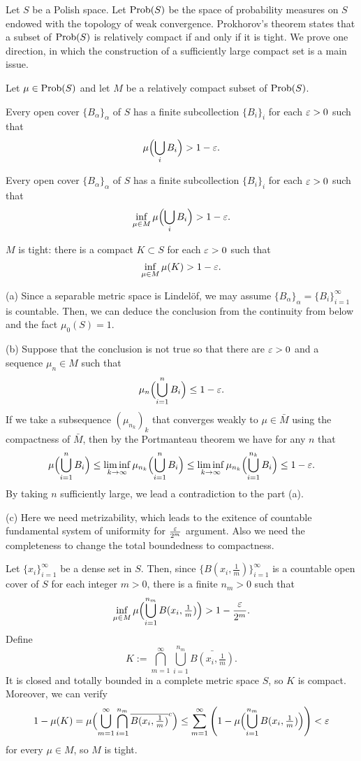 \documentclass{../note}
\begin{document}
\begin{prb}
Let $S$ be a Polish space.
Let $\operatorname{Prob}(S)$ be the space of probability measures on $S$ endowed with the topology of weak convergence.
Prokhorov's theorem states that a subset of $\operatorname{Prob}(S)$ is relatively compact if and only if it is tight.
We prove one direction, in which the construction of a sufficiently large compact set is a main issue.

Let $\mu\in\operatorname{Prob}(S)$ and let $M$ be a relatively compact subset of $\operatorname{Prob}(S)$.
\begin{parts}
\item Every open cover $\{B_\alpha\}_\alpha$ of $S$ has a finite subcollection $\{B_i\}_i$ for each $\varepsilon>0$ such that
\[\mu\Bigl(\bigcup_iB_i\Bigr)>1-\varepsilon.\]
\item Every open cover $\{B_\alpha\}_\alpha$ of $S$ has a finite subcollection $\{B_i\}_i$ for each $\varepsilon>0$ such that
\[\inf_{\mu\in M}\mu\Bigl(\bigcup_iB_i\Bigr)>1-\varepsilon.\]
\item $M$ is tight: there is a compact $K\subset S$ for each $\varepsilon>0$ such that
\[\inf_{\mu\in M}\mu(K)>1-\varepsilon.\]
\end{parts}
\end{prb}
\begin{pf}
(a)
Since a separable metric space is Lindel\"of, we may assume $\{B_\alpha\}_\alpha=\{B_i\}_{i=1}^\infty$ is countable.
Then, we can deduce the conclusion from the continuity from below and the fact $\mu_0(S)=1$.

(b)
Suppose that the conclusion is not true so that there are $\varepsilon>0$ and a sequence $\mu_n\in M$ such that
\[\mu_n\Bigl(\bigcup_{i=1}^nB_i\Bigr)\le1-\varepsilon.\]
If we take a subsequence $(\mu_{n_k})_k$ that converges weakly to $\mu\in\bar M$ using the compactness of $\bar M$, then by the Portmanteau theorem we have for any $n$ that
\[\mu\Bigl(\bigcup_{i=1}^nB_i\Bigr)\le\liminf_{k\to\infty}\mu_{n_k}\Bigl(\bigcup_{i=1}^nB_i\Bigr)\le\liminf_{k\to\infty}\mu_{n_k}\Bigl(\bigcup_{i=1}^{n_k}B_i\Bigr)\le1-\varepsilon.\]
By taking $n$ sufficiently large, we lead a contradiction to the part (a).

(c)
Here we need metrizability, which leads to the exitence of countable fundamental system of uniformity for $\frac{\varepsilon}{2^m}$ argument.
Also we need the completeness to change the total boundedness to compactness.

Let $\{x_i\}_{i=1}^\infty$ be a dense set in $S$.
Then, since $\{B(x_i,\frac1m)\}_{i=1}^\infty$ is a countable open cover of $S$ for each integer $m>0$, there is a finite $n_m>0$ such that
\[\inf_{\mu\in M}\mu\Bigl(\bigcup_{i=1}^{n_m}B(x_i,\tfrac1m)\Bigr)>1-\frac{\varepsilon}{2^m}.\]
Define
\[K:=\bigcap_{m=1}^\infty\bigcup_{i=1}^{n_m}\bar{B(x_i,\tfrac1m)}.\]
It is closed and totally bounded in a complete metric space $S$, so $K$ is compact.
Moreover, we can verify
\[1-\mu(K)=\mu\Bigl(\bigcup_{m=1}^\infty\bigcap_{i=1}^{n_m}\overline{B(x_i,\tfrac1m)}^c\Bigr)\le\sum_{m=1}^\infty\left(1-\mu\Bigl(\bigcup_{i=1}^{n_m}B(x_i,\tfrac1m)\Bigr)\right)<\varepsilon\]
for every $\mu\in M$, so $M$ is tight.
\end{pf}
\end{document}
